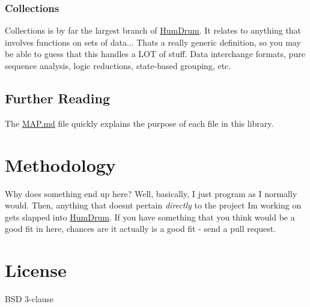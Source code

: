 \subsubsection*{Collections}

Collections is by far the largest branch of \hyperlink{namespaceHumDrum}{Hum\+Drum}. It relates to anything that involves functions on sets of data... That\textquotesingle{}s a really generic definition, so you may be able to guess that this handles a L\+O\+T of stuff. Data interchange formats, pure sequence analysis, logic reductions, state-\/based grouping, etc.

\subsection*{Further Reading}

The \hyperlink{MAP_8md_source}{M\+A\+P.\+md} file quickly explains the purpose of each file in this library.

\section*{Methodology}

Why does something end up here? Well, basically, I just program as I normally would. Then, anything that doesn\textquotesingle{}t pertain {\itshape directly} to the project I\textquotesingle{}m working on gets slapped into \hyperlink{namespaceHumDrum}{Hum\+Drum}. If you have something that you think would be a good fit in here, chances are it actually is a good fit -\/ send a pull request.

\section*{License}

B\+S\+D 3-\/clause 
